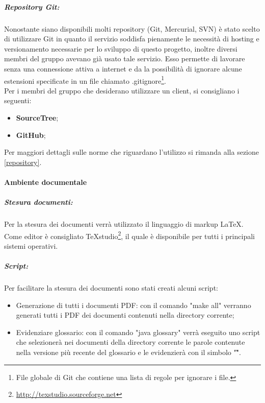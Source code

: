 \subparagraph{Repository Git:}

Nonostante siano disponibili molti \gls{repository} (\gls{Git}, \gls{Mercurial}, \gls{SVN}) è stato scelto di utilizzare \gls{Git} in quanto il servizio soddisfa pienamente le necessità di \gls{hosting} e \gls{versionamento} necessarie per lo sviluppo di questo progetto, inoltre diversi membri del gruppo avevano già usato tale servizio. Esso permette di lavorare senza una connessione attiva a internet e da la possibilità di ignorare alcune estensioni specificate in un file chiamato .gitignore\footnote{File globale di \gls{Git} che contiene una lista di regole per ignorare i file.}.\\ Per i membri del gruppo che desiderano utilizzare un client, si consigliano i seguenti:
\begin{itemize}
	\item \textbf{SourceTree};
	\item \textbf{\gls{GitHub}};
\end{itemize}
Per maggiori dettagli sulle norme che riguardano l'utilizzo si rimanda alla sezione \ref{repository}.

\newpage
\paragraph{Ambiente documentale}

\subparagraph{Stesura documenti:}

Per la stesura dei documenti verrà utilizzato il \gls{linguaggio di markup} \LaTeX.
Come editor è consigliato TeXstudio\footnote{\url{http://texstudio.sourceforge.net}}, il quale è disponibile per tutti i principali sistemi operativi.

\subparagraph{Script:}

Per facilitare la stesura dei documenti sono stati creati alcuni script:

\begin{itemize}
	\item Generazione di tutti i documenti PDF: con il comando "make all" verranno generati tutti i PDF dei documenti contenuti nella directory corrente;
	\item Evidenziare glossario: con il comando "java glossary" verrà eseguito uno script che selezionerà nei documenti della directory corrente le parole contenute nella versione più recente del glossario e le evidenzierà con il simbolo "\G".

\end{itemize}

